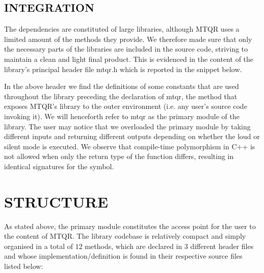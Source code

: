 \documentclass[a4paper, twosided]{book}
\begin{document}
\subsection[Integration]{\changefont INTEGRATION}\label{SubSec2.1.3}

\noindent
The dependencies are constituted of large libraries, although MTQR uses a limited amount of the methods they provide. We therefore made sure that only the necessary parts of the libraries are included in the source code, striving to maintain a clean and light final product. This is evidenced in the content of the library's principal header file \colorbox{poliGrayBlue}{mtqr.h} which is reported in the snippet below.

\vspace{0.15cm}

\noindent
In the above header we find the definitions of some constants that are used throughout the library preceding  the declaration of \colorbox{poliGrayBlue}{mtqr}, the method that exposes MTQR's library to the outer environment (i.e. any user's source code invoking it). We will henceforth refer to \colorbox{poliGrayBlue}{mtqr} as the primary module of the library. The user may notice that we overloaded the primary module by taking different inputs and returning different outputs depending on whether the loud or silent mode is executed. We observe that compile-time polymorphism in C++ is not allowed when only the return type of the function differs, resulting in identical signatures for the symbol.

\section[Structure]{\changefont STRUCTURE}\label{Sec2.2}

\noindent
 As stated above, the primary module constitutes the access point for the user to the content of MTQR. The library codebase is relatively compact and simply organised in a total of $12$ methods, which are declared in $3$ different header files and whose implementation/definition is found in their respective source files listed below:
\end{document}
